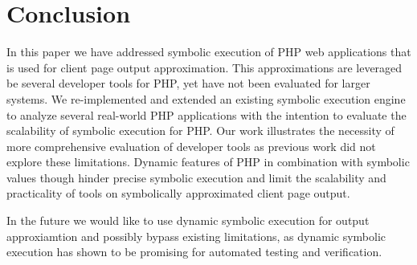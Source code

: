 \documentclass[sigconf]{acmart}
\begin{document}
\section{Conclusion}
In this paper we have addressed symbolic execution of PHP web applications that
is used for client page output approximation. This approximations are leveraged
be several developer tools for PHP, yet have not been evaluated for larger
systems. We re-implemented and extended an existing symbolic execution engine
to analyze several real-world PHP applications with the intention to evaluate
the scalability of symbolic execution for PHP. Our work illustrates the
necessity of more comprehensive evaluation of developer tools as
previous work did not explore these limitations. Dynamic features of PHP in
combination with symbolic values though hinder precise symbolic execution and
limit the scalability and practicality of tools on symbolically approximated
client page output.

In the future we would like to use dynamic symbolic execution for output
approxiamtion and possibly bypass existing limitations, as dynamic symbolic
execution has shown to be promising for automated testing and verification.


 
\end{document}
